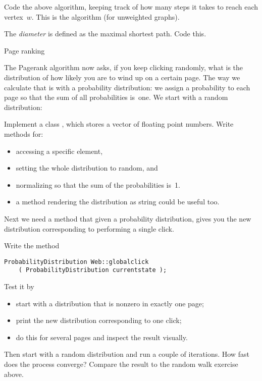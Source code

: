 \begin{exercise}
  \label{ex:SSSD}
  Code the above algorithm, keeping track of how many steps it takes
  to reach each vertex~$w$. This is the  algorithm (for unweighted graphs).

  The \emph{diameter} is defined as the maximal
  shortest path. Code this.
\end{exercise}

 {Page ranking}

The Pagerank algorithm now asks, if you keep clicking randomly, what
is the distribution of how likely you are to wind up on a certain
page. The way we calculate that is with a probability distribution: we
assign a probability to each page so that the sum of all probabilities
is~one. We start with a random distribution:
%

\begin{exercise}
  Implement a class , which stores a vector
  of floating point numbers. Write methods for:
  \begin{itemize}
  \item
    accessing a specific
    element,
  \item setting the whole distribution to random, and
  \item normalizing
    so that the sum of the probabilities is~1.
  \item a method rendering the distribution as string could be useful too.
  \end{itemize}
\end{exercise}

Next we need a method that given a probability distribution,
gives you the new distribution corresponding to performing a single click.

\begin{exercise}
  Write the method
\begin{lstlisting}
ProbabilityDistribution Web::globalclick
    ( ProbabilityDistribution currentstate );
\end{lstlisting}
Test it by
\begin{itemize}
\item start with a distribution that is nonzero in exactly one page;
\item print the new distribution corresponding to one click;
\item do this for several pages and inspect the result visually.
\end{itemize}
Then start with a random distribution and run a couple of
iterations. How fast does the process converge? Compare the result to
the random walk exercise above.
\end{exercise}

